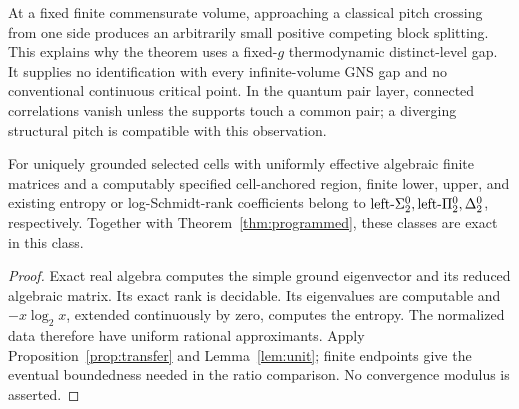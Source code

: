 At a fixed finite commensurate volume, approaching a classical pitch
crossing from one side produces an arbitrarily small positive competing
block splitting. This explains why the theorem uses a fixed-$g$
thermodynamic distinct-level gap. It supplies no identification with
every infinite-volume GNS gap and no conventional continuous critical
point. In the quantum pair layer, connected correlations vanish unless
the supports touch a common pair; a diverging structural pitch is
compatible with this observation.

\begin{corollary}\label{cor:classes}
For uniquely grounded selected cells with uniformly effective algebraic
finite matrices and a computably specified cell-anchored region, finite
lower, upper, and existing entropy or log-Schmidt-rank coefficients
belong to $\text{left-}\Sigma^0_2,\text{left-}\Pi^0_2,\Delta^0_2$, respectively. Together with
Theorem~\ref{thm:programmed}, these classes are exact in this class.
\end{corollary}
\begin{proof}
Exact real algebra computes the simple ground eigenvector and its
reduced algebraic matrix. Its exact rank is decidable. Its eigenvalues
are computable and $-x\log_2x$, extended continuously by zero, computes
the entropy. The normalized data therefore have uniform rational
approximants. Apply Proposition~\ref{prop:transfer} and
Lemma~\ref{lem:unit}; finite endpoints give the eventual boundedness
needed in the ratio comparison. No convergence modulus is asserted.
\end{proof}

